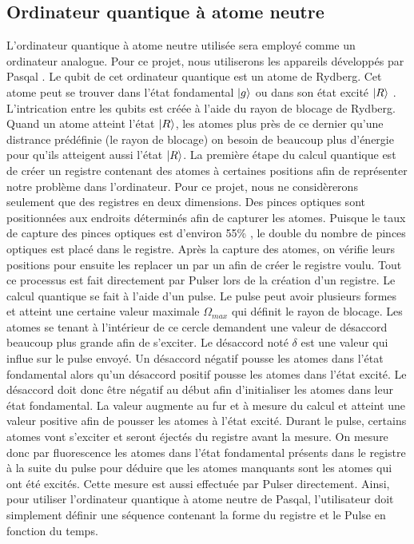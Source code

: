 \documentclass[11pt]{article}
\begin{document}
\subsection{Ordinateur quantique à atome neutre}
L'ordinateur quantique à atome neutre utilisée sera employé comme un ordinateur analogue. Pour ce projet, nous utiliserons les appareils développés par Pasqal \cite{browaeys_quantum_2019}. Le qubit de cet ordinateur quantique est un atome de Rydberg. Cet atome peut se trouver dans l'état fondamental $\ket{g}$ ou dans son état excité $\ket{R}$ \cite{noauthor_learn_nodate}. L'intrication entre les qubits est créée à l'aide du rayon de blocage de Rydberg. Quand un atome atteint l'état $\ket{R}$, les atomes plus près de ce dernier qu'une distrance prédéfinie (le rayon de blocage) on besoin de beaucoup plus d'énergie pour qu'ils atteigent aussi l'état $\ket{R}$. La première étape du calcul quantique est de créer un registre contenant des atomes à certaines positions afin de représenter notre problème dans l'ordinateur. Pour ce projet, nous ne considèrerons seulement que des registres en deux dimensions. Des pinces optiques sont positionnées \cite{browaeys_pinces_2016} aux endroits déterminés afin de capturer les atomes. Puisque le taux de capture des pinces optiques est d'environ 55\% \cite{muldoon_control_2012}, le double du nombre de pinces optiques est placé dans le registre. Après la capture des atomes, on vérifie leurs positions pour ensuite les replacer un par un afin de créer le registre voulu. Tout ce processus est fait directement par Pulser \cite{silverio_pulser_2022} lors de la création d'un registre. Le calcul quantique se fait à l'aide d'un pulse. Le pulse peut avoir plusieurs formes et atteint une certaine valeur maximale $\Omega_{max} $ qui définit le rayon de blocage.  Les atomes se tenant à l'intérieur de ce cercle demandent une valeur de désaccord beaucoup plus grande afin de s'exciter. Le désaccord noté $\delta$ est une valeur qui influe sur le pulse envoyé. Un désaccord négatif pousse les atomes dans l'état fondamental alors qu'un désaccord positif pousse les atomes dans l'état excité. Le désaccord doit donc être négatif au début afin d'initialiser les atomes dans leur état fondamental. La valeur augmente au fur et à mesure du calcul et atteint une valeur positive afin de pousser les atomes à l'état excité. Durant le pulse, certains atomes vont s'exciter et seront éjectés du registre avant la mesure. On mesure donc par fluorescence les atomes dans l'état fondamental présents dans le registre à la suite du pulse pour déduire que les atomes manquants sont les atomes qui ont été excités. Cette mesure est aussi effectuée par Pulser directement. Ainsi, pour utiliser l'ordinateur quantique à atome neutre de Pasqal, l'utilisateur doit simplement définir une séquence contenant la forme du registre et le Pulse en fonction du temps. 
\end{document}
